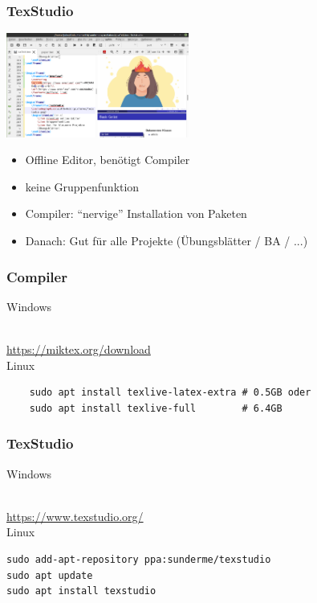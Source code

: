 \documentclass{beamer}
\begin{document}
\begin{frame}
    \frametitle{TexStudio}
    \includegraphics[width=6cm]{pictures/texstudio.png}
    \begin{itemize}[<+->]
        \item Offline Editor, benötigt Compiler
        \item keine Gruppenfunktion
        \item Compiler: ``nervige'' Installation von Paketen
        \item Danach: Gut für alle Projekte (Übungsblätter / BA / ...)
    \end{itemize}
\end{frame}

\begin{frame}[fragile]
    \frametitle{Compiler}
    Windows\vspace{2mm}
    \centering

    \\
    \url{https://miktex.org/download}\\
    \vspace{5mm}
    \hline
    \vspace{5mm}
    Linux
    \begin{verbatim}
    sudo apt install texlive-latex-extra # 0.5GB oder
    sudo apt install texlive-full        # 6.4GB
    \end{verbatim}
\end{frame}

\begin{frame}[fragile]
    \frametitle{TexStudio}
    Windows\vspace{2mm}
    \centering

    \\
    \url{https://www.texstudio.org/}\\
    \vspace{5mm}
    \hline
    \vspace{5mm}
    Linux
    \begin{verbatim}
sudo add-apt-repository ppa:sunderme/texstudio
sudo apt update
sudo apt install texstudio
\end{verbatim}
\end{frame}
\end{document}
